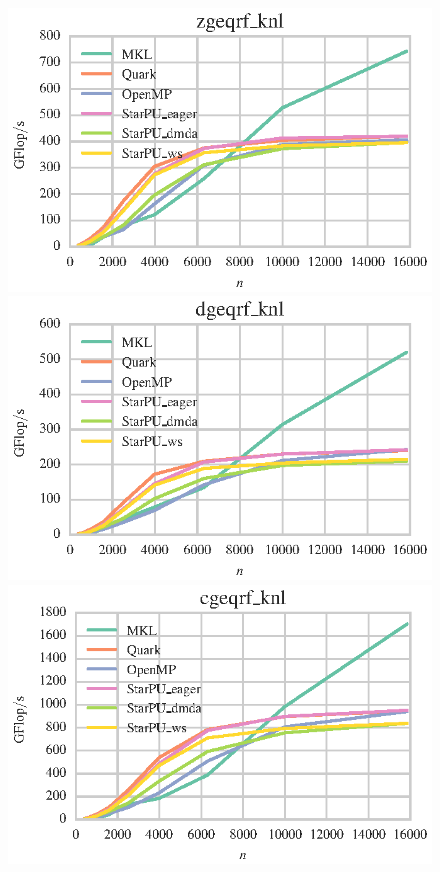\documentclass[a4paper,12pt]{article}
\begin{document}
\begin{figure}[t]
  \centering
  \includegraphics[scale=.85]{fig/knl_ram_zgeqrf_weak_scaling.eps}
  \includegraphics[scale=.85]{fig/knl_ram_dgeqrf_weak_scaling.eps}
  \includegraphics[scale=.85]{fig/knl_ram_cgeqrf_weak_scaling.eps}

\end{figure}
\end{document}
